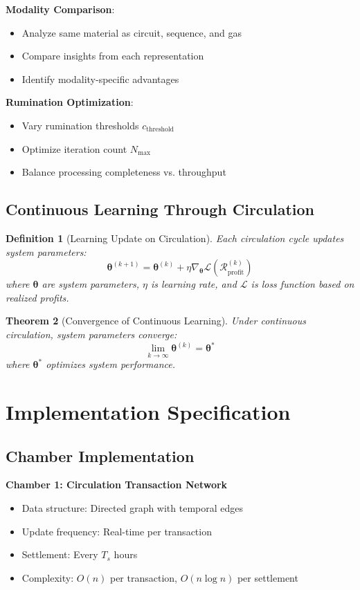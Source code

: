\documentclass[12pt]{article}
\newtheorem{theorem}{Theorem}
\newtheorem{definition}[theorem]{Definition}
\begin{document}
\textbf{Modality Comparison}:
\begin{itemize}
    \item Analyze same material as circuit, sequence, and gas
    \item Compare insights from each representation
    \item Identify modality-specific advantages
\end{itemize}

\textbf{Rumination Optimization}:
\begin{itemize}
    \item Vary rumination thresholds $c_{\text{threshold}}$
    \item Optimize iteration count $N_{\text{max}}$
    \item Balance processing completeness vs. throughput
\end{itemize}

\subsection{Continuous Learning Through Circulation}

\begin{definition}[Learning Update on Circulation]
Each circulation cycle updates system parameters:
$$
\boldsymbol{\theta}^{(k+1)} = \boldsymbol{\theta}^{(k)} + \eta \nabla_{\boldsymbol{\theta}} \mathcal{L}(\mathcal{R}_{\text{profit}}^{(k)})
$$
where $\boldsymbol{\theta}$ are system parameters, $\eta$ is learning rate, and $\mathcal{L}$ is loss function based on realized profits.
\end{definition}

\begin{theorem}[Convergence of Continuous Learning]
Under continuous circulation, system parameters converge:
$$
\lim_{k \to \infty} \boldsymbol{\theta}^{(k)} = \boldsymbol{\theta}^*
$$
where $\boldsymbol{\theta}^*$ optimizes system performance.
\end{theorem}

\section{Implementation Specification}

\subsection{Chamber Implementation}

\textbf{Chamber 1: Circulation Transaction Network}
\begin{itemize}
    \item Data structure: Directed graph with temporal edges
    \item Update frequency: Real-time per transaction
    \item Settlement: Every $T_s$ hours
    \item Complexity: $O(n)$ per transaction, $O(n \log n)$ per settlement
\end{itemize}
\end{document}
